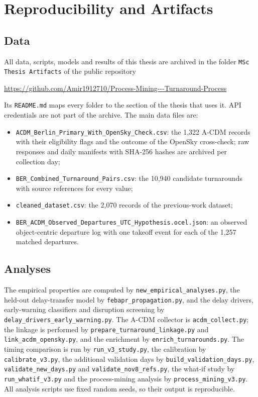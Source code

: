 \chapter{Reproducibility and Artifacts}
\label{app:repro}
\sloppy

\section{Data}
All data, scripts, models and results of this thesis are archived in the folder \texttt{MSc Thesis Artifacts} of the public repository
\begin{center}\url{https://github.com/Amir1912710/Process-Mining---Turnaround-Process}\end{center}
Its \texttt{README.md} maps every folder to the section of the thesis that uses it. API credentials are not part of the archive. The main data files are:
\begin{itemize}
\item \texttt{ACDM\_Berlin\_Primary\_With\_}\allowbreak\texttt{OpenSky\_Check.csv}: the 1,322 A-CDM records with their eligibility flags and the outcome of the OpenSky cross-check; raw responses and daily manifests with SHA-256 hashes are archived per collection day;
\item \texttt{BER\_Combined\_Turnaround\_Pairs.csv}: the 10,940 candidate turnarounds with source references for every value;
\item \texttt{cleaned\_dataset.csv}: the 2,070 records of the previous-work dataset;
\item \texttt{BER\_ACDM\_Observed\_Departures\_}\allowbreak\texttt{UTC\_Hypothesis.ocel.json}: an observed object-centric departure log with one takeoff event for each of the 1,257 matched departures.
\end{itemize}

\section{Analyses}
The empirical properties are computed by \texttt{new\_empirical\_analyses.py}, the held-out delay-transfer model by \texttt{febapr\_propagation.py}, and the delay drivers, early-warning classifiers and disruption screening by \texttt{delay\_drivers\_early\_warning.py}. The A-CDM collector is \texttt{acdm\_collect.py}; the linkage is performed by \texttt{prepare\_turnaround\_linkage.py} and \texttt{link\_acdm\_opensky.py}, and the enrichment by \texttt{enrich\_turnarounds.py}. The timing comparison is run by \texttt{run\_v3\_study.py}, the calibration by \texttt{calibrate\_v3.py}, the additional validation days by \texttt{build\_validation\_days.py}, \texttt{validate\_new\_days.py} and \texttt{validate\_nov8\_refs.py}, the what-if study by \texttt{run\_whatif\_v3.py} and the process-mining analysis by \texttt{process\_mining\_v3.py}. All analysis scripts use fixed random seeds, so their output is reproducible.

